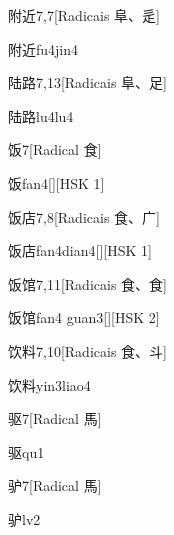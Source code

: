 \begin{entry}{附近}{7,7}[Radicais ⾩、⾡]
  \begin{phonetics}{附近}{fu4jin4}
  \end{phonetics}
\end{entry}

\begin{entry}{陆路}{7,13}[Radicais ⾩、⾜]
  \begin{phonetics}{陆路}{lu4lu4}
  \end{phonetics}
\end{entry}

\begin{entry}{饭}{7}[Radical ⾷]
  \begin{phonetics}{饭}{fan4}[][HSK 1]
  \end{phonetics}
\end{entry}

\begin{entry}{饭店}{7,8}[Radicais ⾷、⼴]
  \begin{phonetics}{饭店}{fan4dian4}[][HSK 1]
  \end{phonetics}
\end{entry}

\begin{entry}{饭馆}{7,11}[Radicais ⾷、⾷]
  \begin{phonetics}{饭馆}{fan4 guan3}[][HSK 2]
  \end{phonetics}
\end{entry}

\begin{entry}{饮料}{7,10}[Radicais ⾷、⽃]
  \begin{phonetics}{饮料}{yin3liao4}
  \end{phonetics}
\end{entry}

\begin{entry}{驱}{7}[Radical ⾺]
  \begin{phonetics}{驱}{qu1}
  \end{phonetics}
\end{entry}

\begin{entry}{驴}{7}[Radical ⾺]
  \begin{phonetics}{驴}{lv2}
  \end{phonetics}
\end{entry}

